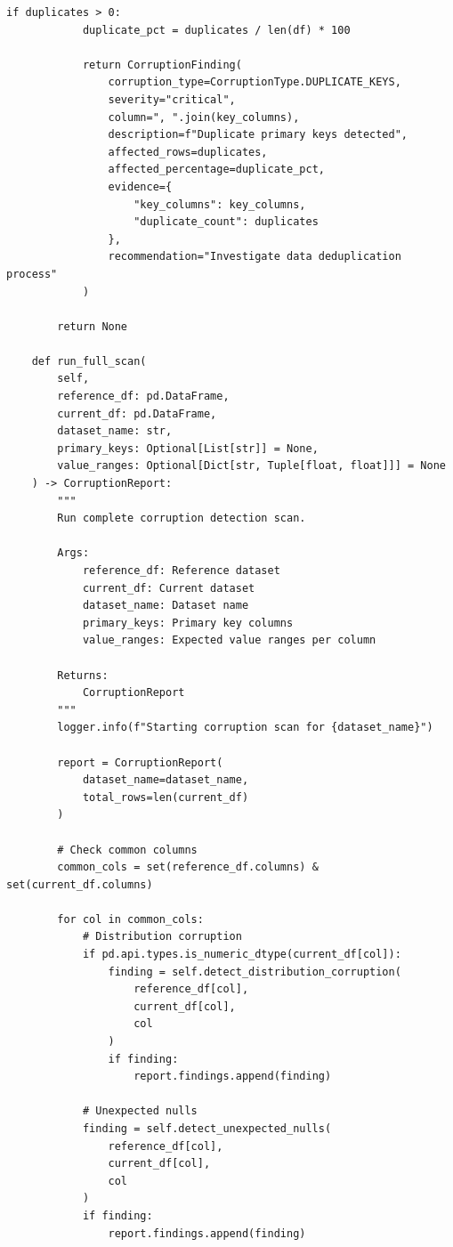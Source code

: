\begin{lstlisting}[style=python, caption={Data corruption detection framework}]
        if duplicates > 0:
            duplicate_pct = duplicates / len(df) * 100

            return CorruptionFinding(
                corruption_type=CorruptionType.DUPLICATE_KEYS,
                severity="critical",
                column=", ".join(key_columns),
                description=f"Duplicate primary keys detected",
                affected_rows=duplicates,
                affected_percentage=duplicate_pct,
                evidence={
                    "key_columns": key_columns,
                    "duplicate_count": duplicates
                },
                recommendation="Investigate data deduplication process"
            )

        return None

    def run_full_scan(
        self,
        reference_df: pd.DataFrame,
        current_df: pd.DataFrame,
        dataset_name: str,
        primary_keys: Optional[List[str]] = None,
        value_ranges: Optional[Dict[str, Tuple[float, float]]] = None
    ) -> CorruptionReport:
        """
        Run complete corruption detection scan.

        Args:
            reference_df: Reference dataset
            current_df: Current dataset
            dataset_name: Dataset name
            primary_keys: Primary key columns
            value_ranges: Expected value ranges per column

        Returns:
            CorruptionReport
        """
        logger.info(f"Starting corruption scan for {dataset_name}")

        report = CorruptionReport(
            dataset_name=dataset_name,
            total_rows=len(current_df)
        )

        # Check common columns
        common_cols = set(reference_df.columns) & set(current_df.columns)

        for col in common_cols:
            # Distribution corruption
            if pd.api.types.is_numeric_dtype(current_df[col]):
                finding = self.detect_distribution_corruption(
                    reference_df[col],
                    current_df[col],
                    col
                )
                if finding:
                    report.findings.append(finding)

            # Unexpected nulls
            finding = self.detect_unexpected_nulls(
                reference_df[col],
                current_df[col],
                col
            )
            if finding:
                report.findings.append(finding)


\end{lstlisting}
